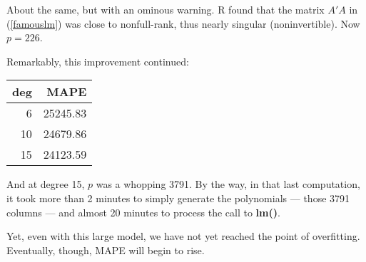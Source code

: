 About the same, but with an ominous warning.  R found that the matrix
$A'A$ in (\ref{famouslm}) was close to nonfull-rank, thus nearly
singular (noninvertible).  Now $p = 226$.

Remarkably, this improvement continued:

\bigskip

\begin{tabular}{|r|r|}
\hline
deg & MAPE \\
\hline
6 & 25245.83 \\
\hline
10 & 24679.86 \\
\hline
15 & 24123.59 \\
\hline
\end{tabular}

And at degree 15, $p$ was a whopping 3791.  By the way, in that last
computation, it took more than 2 minutes to simply generate the
polynomials --- those 3791 columns --- and almost 20 minutes to process
the call to \textbf{lm()}.

Yet, even with this large model, we have not yet reached the point of
overfitting.  Eventually, though, MAPE will begin to rise.

